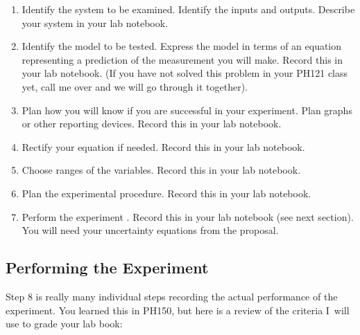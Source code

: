 \begin{enumerate}
\item Identify the system to be examined. Identify the inputs and outputs.
Describe your system in your lab notebook.

\item Identify the model to be tested. Express the model in terms of an
equation representing a prediction of the measurement you will make. Record
this in your lab notebook. (If you have not solved this problem in your
PH121 class yet, call me over and we will go through it together).

\item Plan how you will know if you are successful in your experiment. Plan
graphs or other reporting devices. Record this in your lab notebook.

\item Rectify your equation if needed. Record this in your lab notebook.

\item Choose ranges of the variables. Record this in your lab notebook.

\item Plan the experimental procedure. Record this in your lab notebook.

\item Perform the experiment . Record this in your lab notebook (see next
section). You will need your uncertainty equations from the proposal.
\end{enumerate}

\subsection{Performing the Experiment}

Step 8 is really many individual steps recording the actual performance of
the experiment. You learned this in PH150, but here is a review of the
criteria I\ will use to grade your lab book:

